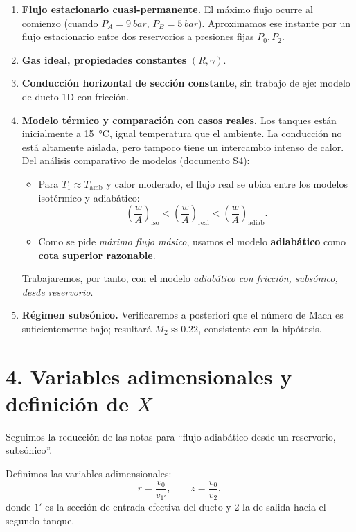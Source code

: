 \documentclass[11pt,a4paper]{article}
\begin{document}
\begin{enumerate}
\item \textbf{Flujo estacionario cuasi-permanente.}
El máximo flujo ocurre al comienzo (cuando $P_A = \SI{9}{bar}$, $P_B = \SI{5}{bar}$).
Aproximamos ese instante por un flujo estacionario entre dos reservorios a presiones fijas $P_0, P_2$.

\item \textbf{Gas ideal, propiedades constantes} $(R,\gamma)$.

\item \textbf{Conducción horizontal de sección constante}, sin trabajo de eje:
modelo de ducto 1D con fricción.

\item \textbf{Modelo térmico y comparación con casos reales.}
Los tanques están inicialmente a \SI{15}{\celsius}, igual temperatura que el ambiente.
La conducción no está altamente aislada, pero tampoco tiene un intercambio intenso de calor.
Del análisis comparativo de modelos (documento S4):

\begin{itemize}
  \item Para $T_1 \approx T_{\text{amb}}$ y calor moderado, el flujo real se ubica entre los modelos
  isotérmico y adiabático:
  \[
    \left(\frac{w}{A}\right)_{\text{iso}}
    < \left(\frac{w}{A}\right)_{\text{real}}
    < \left(\frac{w}{A}\right)_{\text{adiab}}.
  \]
  \item Como se pide \emph{máximo flujo másico}, usamos el modelo \textbf{adiabático} como
  \textbf{cota superior razonable}.
\end{itemize}

Trabajaremos, por tanto, con el modelo \emph{adiabático con fricción, subsónico, desde reservorio}.

\item \textbf{Régimen subsónico.}
Verificaremos a posteriori que el número de Mach es suficientemente bajo;
resultará $M_2 \approx 0.22$, consistente con la hipótesis.
\end{enumerate}

\section*{4. Variables adimensionales y definición de $X$}

Seguimos la reducción de las notas para ``flujo adiabático desde un reservorio, subsónico''.

Definimos las variables adimensionales:
\[
r = \frac{v_0}{v_{1'}}, \qquad
z = \frac{v_0}{v_2},
\]
donde $1'$ es la sección de entrada efectiva del ducto y $2$ la de salida hacia el segundo tanque.
\end{document}
